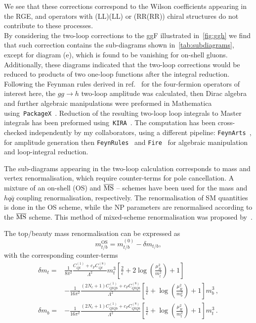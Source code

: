 	\par We see that these corrections correspond to the Wilson coefficients appearing in the RGE, and operators with (LL)(LL) or (RR(RR)) chiral structures do not contribute to these processes. \\ By considering the two-loop corrections to the ggF illustrated in~\autoref{fig:ggh} we find that such correction contains the sub-diagrams shown in~\autoref{tab:subdiagrams}, except for diagram (e), which is found to be vanishing for on-shell gluons. Additionally, these diagrams indicated that the two-loop corrections would be reduced to products of two one-loop functions after the integral reduction. \\
	Following the Feynman rules derived in ref.~\cite{Dedes:2017zog} for the four-fermion operators of interest here, the $ gg \to h$ two-loop amplitude was calculated, then Dirac algebra and further algebraic manipulations were preformed in Mathematica using~\texttt{PackageX}~\cite{Patel:2015tea}. Reduction of the resulting two-loop loop integrals to Master integrals has been preformed using~\texttt{KIRA}~\cite{Maierhoefer:2017hyi}. The computation has been cross-checked independently by my collaborators, using a different pipeline: \texttt{FeynArts}~\cite{Hahn:2000kx}, for amplitude generation then  \texttt{FeynRules}~\cite{Alloul:2013bka}  and  \texttt{Fire}~\cite{Smirnov:2008iw} for algebraic manipulation and loop-integral reduction. \\
	\par
	The sub-diagrams appearing in the two-loop calculation corresponds to mass and vertex renormalisation, which require counter-terms for pole cancellation. A mixture of an on-shell (OS) and $\overline{\mathrm{MS}}$ -- schemes have been used for the mass and ~$h q \bar{q}$ coupling renormalisation, respectively. The renormalisation of SM quantities is  done in the OS scheme, while the NP parameters are renormalised according to the $\overline{\mathrm{MS}}$ scheme. This method of mixed-scheme renormalisation was proposed by~\cite{Dawson:2018pyl}.
	\par The top/beauty mass renormalisation can be expressed as  
	\begin{equation}
		m_{t/b}^{\text{OS}}=m_{t/b}^{(0)}-\delta m_{t/b},
	\end{equation}
	with the corresponding counter-terms
	\begin{align}
		\delta m_t =&\frac{1}{8 \pi^2} \frac{C_{Qt}^{(1)}+c_F C_{Qt}^{(8)}}{\Lambda^2}m_t^3\left[ \frac{2}{\bar{\epsilon}} +2 \log\left(\frac{\mu_R^2}{m_t^2}\right)+1\right] \\ &- \frac{1}{16 \pi^2}  \frac{(2 N_c+1) C_{QtQb}^{(1)}+c_F C_{QtQb}^{(8)}}{\Lambda^2}  \left[ \frac{1}{\bar{\epsilon}} +  \log\left(\frac{\mu_R^2}{m_b^2}\right)+1 \right]  m_b^3\,, \nonumber \\
		\delta m_b=&-\frac{1}{16 \pi^2} \frac{(2 N_c+1)C_{QtQb}^{(1)}+c_F C_{QtQb}^{(8)}}{\Lambda^2}\left[ \frac{1}{\bar{\epsilon}} +\log\left( \frac{\mu_R^2}{m_t^2}\right)+1\right] m_t^3\,.
	\end{align}

